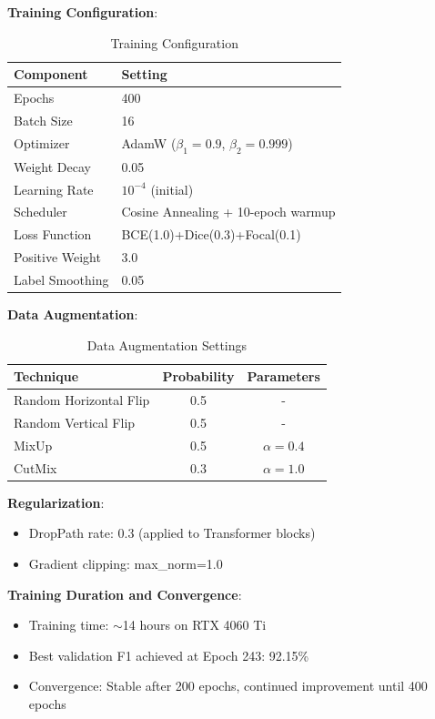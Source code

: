 \documentclass[journal]{IEEEtran}
\begin{document}
\textbf{Training Configuration}:

\begin{table}[h]
\centering
\caption{Training Configuration}
\label{tab:training_config}
\begin{tabular}{ll}
\toprule
\textbf{Component} & \textbf{Setting} \\
\midrule
Epochs & 400 \\
Batch Size & 16 \\
Optimizer & AdamW ($\beta_1=0.9$, $\beta_2=0.999$) \\
Weight Decay & 0.05 \\
Learning Rate & $10^{-4}$ (initial) \\
Scheduler & Cosine Annealing + 10-epoch warmup \\
Loss Function & BCE(1.0)+Dice(0.3)+Focal(0.1) \\
Positive Weight & 3.0 \\
Label Smoothing & 0.05 \\
\bottomrule
\end{tabular}
\end{table}

\textbf{Data Augmentation}:

\begin{table}[h]
\centering
\caption{Data Augmentation Settings}
\label{tab:augmentation}
\begin{tabular}{lcc}
\toprule
\textbf{Technique} & \textbf{Probability} & \textbf{Parameters} \\
\midrule
Random Horizontal Flip & 0.5 & - \\
Random Vertical Flip & 0.5 & - \\
MixUp & 0.5 & $\alpha=0.4$ \\
CutMix & 0.3 & $\alpha=1.0$ \\
\bottomrule
\end{tabular}
\end{table}

\textbf{Regularization}:
\begin{itemize}
    \item DropPath rate: 0.3 (applied to Transformer blocks)
    \item Gradient clipping: max\_norm=1.0
\end{itemize}

\textbf{Training Duration and Convergence}:
\begin{itemize}
    \item Training time: $\sim$14 hours on RTX 4060 Ti
    \item Best validation F1 achieved at Epoch 243: 92.15\%
    \item Convergence: Stable after 200 epochs, continued improvement until 400 epochs
\end{itemize}
\end{document}
